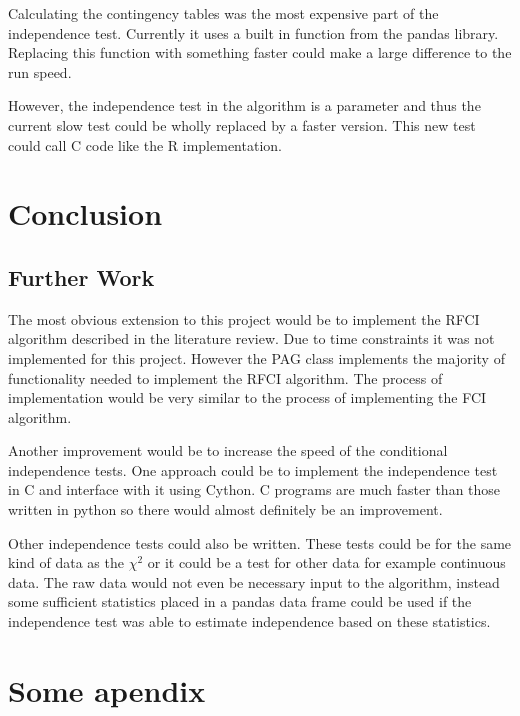 \documentclass{UoYCSproject}
\begin{document}
Calculating the contingency tables was the most expensive part of the independence test. Currently it uses a built in function from the pandas library. Replacing this function with something faster could make a large difference to the run speed.

However, the independence test in the algorithm is a parameter and thus the current slow test could be wholly replaced by a faster version. This new test could call C code like the R implementation.

\chapter{Conclusion}
\section{Further Work}
The most obvious extension to this project would be to implement the RFCI algorithm described in the literature review. Due to time constraints it was not implemented for this project. However the PAG class implements the majority of functionality needed to implement the RFCI algorithm. The process of implementation would be very similar to the process of implementing the FCI algorithm.

Another improvement would be to increase the speed of the conditional independence tests. One approach could be to implement the independence test in C and interface with it using Cython. C programs are much faster than those written in python so there would almost definitely be an improvement.

Other independence tests could also be written. These tests could be for the same kind of data as the $\chi^2$ or it could be a test for other data for example continuous data. The raw data would not even be necessary input to the algorithm, instead some sufficient statistics placed in a pandas data frame could be used if the independence test was able to estimate independence based on these statistics.

\appendix
\chapter{Some apendix}
\printbibliography
\end{document}
